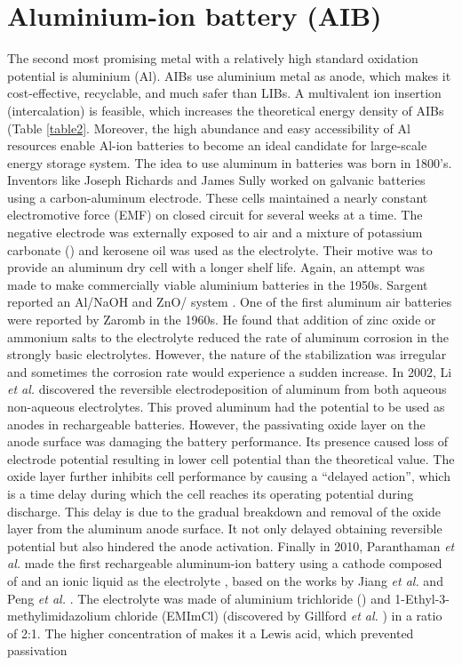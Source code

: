 \section{Aluminium-ion battery (AIB)}
The second most promising metal with a relatively high standard oxidation potential is aluminium (Al). AIBs use aluminium metal as anode, which makes it cost-effective, recyclable, and much safer than LIBs. A multivalent ion insertion (intercalation) is feasible, which increases the theoretical energy density of AIBs (Table \ref{table2}. Moreover, the high abundance and easy accessibility of Al resources enable Al-ion batteries to become an ideal candidate for large-scale energy storage system. 
The idea to use aluminum in batteries was born in 1800’s. Inventors like Joseph Richards and James Sully worked on galvanic batteries using a carbon-aluminum electrode\cite{richards_aluminum_1887, sully_james_1897}. These cells maintained a nearly constant electromotive force (EMF) on closed circuit for several weeks at a time. The negative electrode was externally exposed to air and a mixture of potassium carbonate () and kerosene oil was used as the electrolyte. Their motive was to provide an aluminum dry cell with a longer shelf life. Again, an attempt was made to make commercially viable aluminium batteries in the 1950s. Sargent reported an Al/NaOH and ZnO/ system \cite{sargent_voltaic_1951}. One of the first aluminum air batteries were reported by Zaromb\cite{zaromb_use_1962} in the 1960s. He found that addition of zinc oxide or ammonium salts to the electrolyte reduced the rate of aluminum corrosion in the strongly basic electrolytes. However, the nature of the stabilization was irregular and sometimes the corrosion rate would experience a sudden increase\cite{bockstie_control_1963}. In 2002, Li \textit{et al.} discovered the reversible electrodeposition of aluminum from both aqueous non-aqueous electrolytes\cite{li_aluminum_2002}. This proved aluminum had the potential to be used as anodes in rechargeable batteries. However, the passivating oxide layer on the anode surface was damaging the battery performance. Its presence caused loss of electrode potential resulting in lower cell potential than the theoretical value. The oxide layer further inhibits cell performance by causing a “delayed action”, which is a time delay during which the cell reaches its operating potential during discharge. This delay is due to the gradual breakdown and removal of the oxide layer from the aluminum anode surface. It not only delayed obtaining reversible potential but also hindered the anode activation. Finally in 2010, Paranthaman \textit{et al.} made the first rechargeable aluminum-ion battery using a cathode composed of  and an ionic liquid as the electrolyte \cite{paranthaman_transformational_2010-1}, based on the works by Jiang \textit{et al.} and Peng \textit{et al.} \cite{jiang_electrodeposition_2006-1,peng_investigation}. The electrolyte was made of aluminium trichloride () and 1-Ethyl-3-methylimidazolium chloride (EMImCl) (discovered by Gillford \textit{et al.} \cite{gifford_aluminum/chlorine_1988-1}) in a ratio of 2:1. The higher concentration of  makes it a Lewis acid, which prevented passivation 